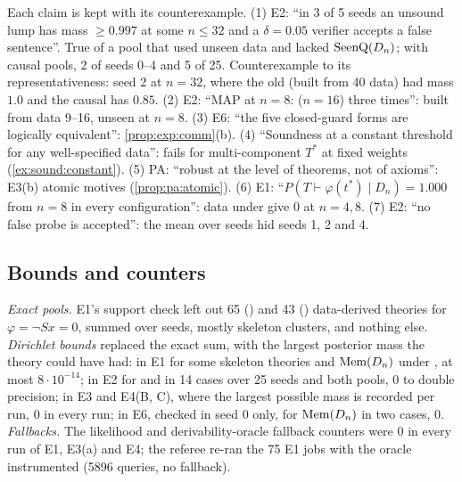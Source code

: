 \begin{remark}\expbrk{}\label{rem:exp:refuted}
Each claim is kept with its counterexample.
(1) E2: ``in 3 of 5 seeds an unsound lump has mass $\ge0.997$ at some $n\le32$ and a $\delta=0.05$ verifier accepts a false sentence''. True of a pool that used unseen data and lacked $\mathrm{SeenQ}(D_n)$; with causal pools, 2 of seeds 0--4 and 5 of 25. Counterexample to its representativeness: seed 2 at $n=32$, where the old  (built from 40 data) had mass $1.0$ and the causal  has $0.85$.
(2) E2: ``MAP at $n=8$: \DTRC($n=16$) three times'': built from data 9--16, unseen at $n=8$.
(3) E6: ``the five closed-guard forms are logically equivalent'': \cref{prop:exp:comm}(b).
(4) ``Soundness at a constant threshold for any well-specified data'': fails for multi-component $T^*$ at fixed weights (\cref{ex:sound:constant}).
(5) PA: ``robust at the level of theorems, not of axioms'': E3(b) atomic motives (\cref{prop:pa:atomic}).
(6) E1: ``$P(T\vdash\varphi(t^*)\mid D_n)=1.000$ from $n=8$ in every configuration'':  data under \Lzero{} give $0$ at $n=4,8$.
(7) E2: ``no false probe is accepted'': the mean over seeds hid seeds 1, 2 and 4.
\end{remark}

\subsection{Bounds and counters}\label{app:exp:pools}

\emph{Exact \Lone{} pools.} E1's support check left out 65 () and 43 () data-derived theories for $\varphi=\neg Sx=0$, summed over seeds, mostly skeleton clusters, and nothing else.
\emph{Dirichlet bounds} replaced the exact sum, with the largest posterior mass the theory could have had: in E1 for some skeleton theories and $\mathrm{Mem}(D_n)$ under \Lone, at most $8\cdot10^{-14}$; in E2 for  and  in 14 cases over 25 seeds and both pools, $0$ to double precision; in E3 and E4(B, C), where the largest possible mass is recorded per run, $0$ in every run; in E6, checked in seed 0 only, for $\mathrm{Mem}(D_n)$ in two cases, $0$.
\emph{Fallbacks.} The likelihood and derivability-oracle fallback counters were $0$ in every run of E1, E3(a) and E4; the referee re-ran the 75 E1 jobs with the oracle instrumented (5896 queries, no fallback).

